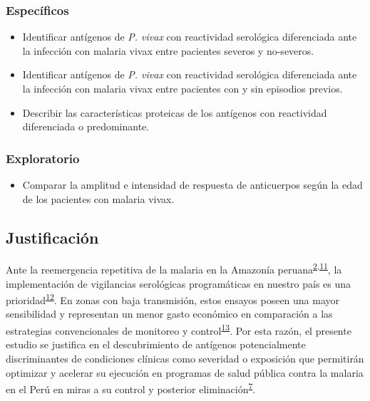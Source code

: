 \documentclass[]{article}
\providecommand{\tightlist}{%
  \setlength{\itemsep}{0pt}\setlength{\parskip}{0pt}}
\begin{document}
\subsubsection{Específicos}\label{especificos}

\begin{itemize}
\item
  Identificar antígenos de \emph{P. vivax} con reactividad serológica
  diferenciada ante la infección con malaria vivax entre pacientes
  severos y no-severos.
\item
  Identificar antígenos de \emph{P. vivax} con reactividad serológica
  diferenciada ante la infección con malaria vivax entre pacientes con y
  sin episodios previos.
\item
  Describir las características proteicas de los antígenos con
  reactividad diferenciada o predominante.
\end{itemize}

\subsubsection{Exploratorio}\label{exploratorio}

\begin{itemize}
\tightlist
\item
  Comparar la amplitud e intensidad de respuesta de anticuerpos según la
  edad de los pacientes con malaria vivax.
\end{itemize}

\subsection{Justificación}\label{justif}

Ante la reemergencia repetitiva de la malaria en la Amazonía
peruana\textsuperscript{\protect\hyperlink{ref-rosas2016peru}{2},\protect\hyperlink{ref-griffing2013history}{11}},
la implementación de vigilancias serológicas programáticas en nuestro
país es una
prioridad\textsuperscript{\protect\hyperlink{ref-hotspots2015}{12}}. En
zonas con baja transmisión, estos ensayos poseen una mayor sensibilidad
y representan un menor gasto económico en comparación a las estrategias
convencionales de monitoreo y
control\textsuperscript{\protect\hyperlink{ref-elliott2014}{13}}. Por
esta razón, el presente estudio se justifica en el descubrimiento de
antígenos potencialmente discriminantes de condiciones clínicas como
severidad o exposición que permitirán optimizar y acelerar su ejecución
en programas de salud pública contra la malaria en el Perú en miras a su
control y posterior
eliminación\textsuperscript{\protect\hyperlink{ref-accelerate2016}{7}}.
\end{document}
